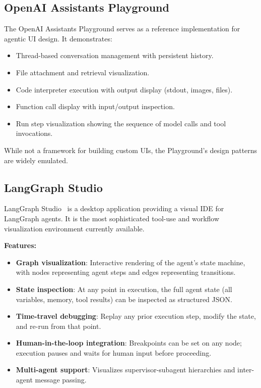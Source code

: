 \subsection{OpenAI Assistants Playground}
\label{openai-assistants-playground}

The OpenAI Assistants Playground serves as a reference implementation for agentic UI design. It demonstrates:

\begin{itemize}
  \item Thread-based conversation management with persistent history.
  \item File attachment and retrieval visualization.
  \item Code interpreter execution with output display (stdout, images, files).
  \item Function call display with input/output inspection.
  \item Run step visualization showing the sequence of model calls and tool invocations.
\end{itemize}

While not a framework for building custom UIs, the Playground’s design patterns are widely emulated.

\subsection{LangGraph Studio}
\label{langgraph-studio}

LangGraph Studio~\cite{langgraph2024studio} is a desktop application providing a visual IDE for LangGraph agents. It is the most sophisticated tool-use and workflow visualization environment currently available.

\textbf{Features:}

\begin{itemize}
  \item \textbf{Graph visualization}: Interactive rendering of the agent’s state machine, with nodes representing agent steps and edges representing transitions.
  \item \textbf{State inspection}: At any point in execution, the full agent state (all variables, memory, tool results) can be inspected as structured JSON.
  \item \textbf{Time-travel debugging}: Replay any prior execution step, modify the state, and re-run from that point.
  \item \textbf{Human-in-the-loop integration}: Breakpoints can be set on any node; execution pauses and waits for human input before proceeding.
  \item \textbf{Multi-agent support}: Visualizes supervisor-subagent hierarchies and inter-agent message passing.
\end{itemize}


